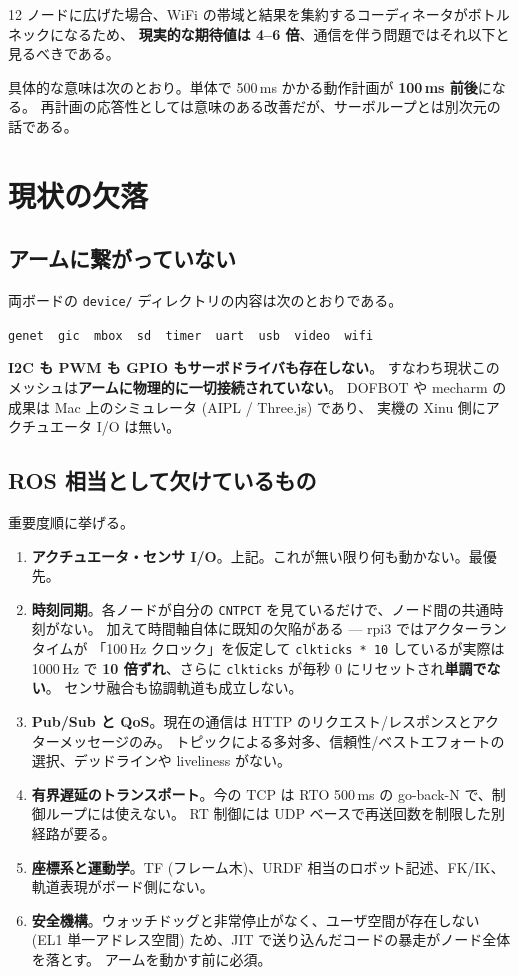 \documentclass[11pt,a4paper]{article}
\newcommand{\code}[1]{\texttt{#1}}
\newcommand{\prob}[1]{\textbf{\textcolor{red!55!black}{#1}}}
\begin{document}
12 ノードに広げた場合、WiFi の帯域と結果を集約するコーディネータがボトルネックになるため、
\textbf{現実的な期待値は 4--6 倍}、通信を伴う問題ではそれ以下と見るべきである。

具体的な意味は次のとおり。単体で 500\,ms かかる動作計画が \textbf{100\,ms 前後}になる。
再計画の応答性としては意味のある改善だが、サーボループとは別次元の話である。

\section{現状の欠落}

\subsection{アームに繋がっていない}

両ボードの \code{device/} ディレクトリの内容は次のとおりである。

\begin{center}
\code{genet\ \ gic\ \ mbox\ \ sd\ \ timer\ \ uart\ \ usb\ \ video\ \ wifi}
\end{center}

\prob{I2C も PWM も GPIO もサーボドライバも存在しない}。
すなわち現状このメッシュは\prob{アームに物理的に一切接続されていない}。
DOFBOT や mecharm の成果は Mac 上のシミュレータ (AIPL / Three.js) であり、
実機の Xinu 側にアクチュエータ I/O は無い。

\subsection{ROS 相当として欠けているもの}

重要度順に挙げる。

\begin{enumerate}[leftmargin=1.6em,itemsep=3pt]
\item \prob{アクチュエータ・センサ I/O}。上記。これが無い限り何も動かない。最優先。
\item \prob{時刻同期}。各ノードが自分の \code{CNTPCT} を見ているだけで、ノード間の共通時刻がない。
      加えて時間軸自体に既知の欠陥がある --- rpi3 ではアクターランタイムが
      「100\,Hz クロック」を仮定して \code{clkticks * 10} しているが実際は 1000\,Hz で
      \textbf{10 倍ずれ}、さらに \code{clkticks} が毎秒 0 にリセットされ\textbf{単調でない}。
      センサ融合も協調軌道も成立しない。
\item \prob{Pub/Sub と QoS}。現在の通信は HTTP のリクエスト/レスポンスとアクターメッセージのみ。
      トピックによる多対多、信頼性/ベストエフォートの選択、デッドラインや liveliness がない。
\item \prob{有界遅延のトランスポート}。今の TCP は RTO 500\,ms の go-back-N で、制御ループには使えない。
      RT 制御には UDP ベースで再送回数を制限した別経路が要る。
\item \prob{座標系と運動学}。TF (フレーム木)、URDF 相当のロボット記述、FK/IK、
      軌道表現がボード側にない。
\item \prob{安全機構}。ウォッチドッグと非常停止がなく、ユーザ空間が存在しない
      (EL1 単一アドレス空間) ため、JIT で送り込んだコードの暴走がノード全体を落とす。
      アームを動かす前に必須。
\end{enumerate}
\end{document}
